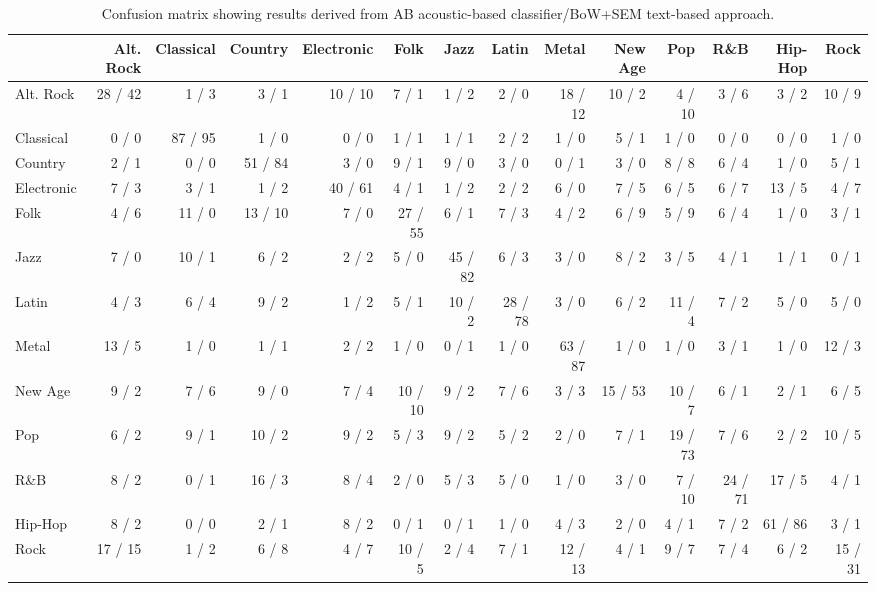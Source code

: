 \begin{table}[]
\centering
\scriptsize
\begin{tabular}{|l|r|r|r|r|r|r|r|r|r|r|r|r|r|}
\hline
& Alt. Rock & Classical & Country & Electronic & Folk & Jazz & Latin & Metal & New Age & Pop & R\&B & Hip-Hop & Rock  \\
\hline
Alt. Rock & 28 / 42 & 1 / 3 & 3 / 1 & 10 / 10 & 7 / 1 & 1 / 2 & 2 / 0 & 18 / 12 & 10 / 2 & 4 / 10 & 3 / 6 & 3 / 2 & 10 / 9 \\
Classical & 0 / 0 & 87 / 95 & 1 / 0 & 0 / 0 & 1 / 1 & 1 / 1 & 2 / 2 & 1 / 0 & 5 / 1 & 1 / 0 & 0 / 0 & 0 / 0 & 1 / 0 \\
Country & 2 / 1 & 0 / 0 & 51 / 84 & 3 / 0 & 9 / 1 & 9 / 0 & 3 / 0 & 0 / 1 & 3 / 0 & 8 / 8 & 6 / 4 & 1 / 0 & 5 / 1 \\
Electronic & 7 / 3 & 3 / 1 & 1 / 2 & 40 / 61 & 4 / 1 & 1 / 2 & 2 / 2 & 6 / 0 & 7 / 5 & 6 / 5 & 6 / 7 & 13 / 5 & 4 / 7 \\
Folk & 4 / 6 & 11 / 0 & 13 / 10 & 7 / 0 & 27 / 55 & 6 / 1 & 7 / 3 & 4 / 2 & 6 / 9 & 5 / 9 & 6 / 4 & 1 / 0 & 3 / 1 \\
Jazz & 7 / 0 & 10 / 1 & 6 / 2 & 2 / 2 & 5 / 0 & 45 / 82 & 6 / 3 & 3 / 0 & 8 / 2 & 3 / 5 & 4 / 1 & 1 / 1 & 0 / 1 \\
Latin & 4 / 3 & 6 / 4 & 9 / 2 & 1 / 2 & 5 / 1 & 10 / 2 & 28 / 78 & 3 / 0 & 6 / 2 & 11 / 4 & 7 / 2 & 5 / 0 & 5 / 0 \\
Metal & 13 / 5 & 1 / 0 & 1 / 1 & 2 / 2 & 1 / 0 & 0 / 1 & 1 / 0 & 63 / 87 & 1 / 0 & 1 / 0 & 3 / 1 & 1 / 0 & 12 / 3 \\
New Age & 9 / 2 & 7 / 6 & 9 / 0 & 7 / 4 & 10 / 10 & 9 / 2 & 7 / 6 & 3 / 3 & 15 / 53 & 10 / 7 & 6 / 1 & 2 / 1 & 6 / 5 \\
Pop & 6 / 2 & 9 / 1 & 10 / 2 & 9 / 2 & 5 / 3 & 9 / 2 & 5 / 2 & 2 / 0 & 7 / 1 & 19 / 73 & 7 / 6 & 2 / 2 & 10 / 5 \\
R\&B & 8 / 2 & 0 / 1 & 16 / 3 & 8 / 4 & 2 / 0 & 5 / 3 & 5 / 0 & 1 / 0 & 3 / 0 & 7 / 10 & 24 / 71 & 17 / 5 & 4 / 1 \\
Hip-Hop & 8 / 2 & 0 / 0 & 2 / 1 & 8 / 2 & 0 / 1 & 0 / 1 & 1 / 0 & 4 / 3 & 2 / 0 & 4 / 1 & 7 / 2 & 61 / 86 & 3 / 1 \\
Rock & 17 / 15 & 1 / 2 & 6 / 8 & 4 / 7 & 10 / 5 & 2 / 4 & 7 / 1 & 12 / 13 & 4 / 1 & 9 / 7 & 7 / 4 & 6 / 2 & 15 / 31 \\
\hline
\end{tabular}
\caption{Confusion matrix showing results derived from AB acoustic-based classifier/BoW+SEM text-based approach.}
\label{tbl:similarity:confusion}
\end{table}


